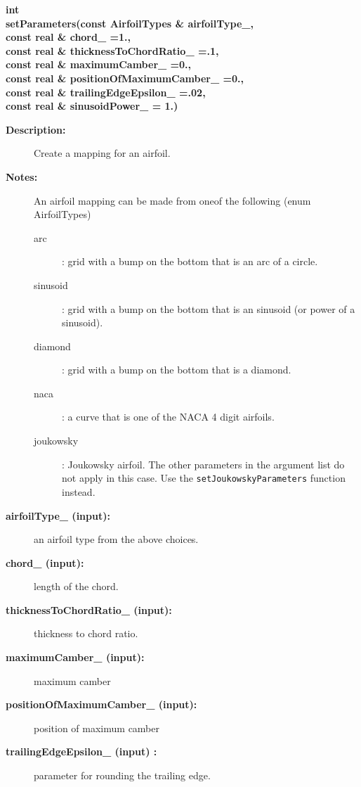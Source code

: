 \begin{flushleft} \textbf{%
int   \\ 
\settowidth{\AirfoilMappingIncludeArgIndent}{setParameters(}%
setParameters(const AirfoilTypes \& airfoilType\_,\\ 
\hspace{\AirfoilMappingIncludeArgIndent}const real \& chord\_  =1., \\ 
\hspace{\AirfoilMappingIncludeArgIndent}const real \& thicknessToChordRatio\_  =.1,\\ 
\hspace{\AirfoilMappingIncludeArgIndent}const real \& maximumCamber\_  =0.,\\ 
\hspace{\AirfoilMappingIncludeArgIndent}const real \& positionOfMaximumCamber\_  =0.,\\ 
\hspace{\AirfoilMappingIncludeArgIndent}const real \& trailingEdgeEpsilon\_   =.02,\\ 
\hspace{\AirfoilMappingIncludeArgIndent}const real \& sinusoidPower\_  = 1.)
}\end{flushleft}
\begin{description}
\item[{\bf Description:}] 
    Create a mapping for an airfoil.
\item[{\bf Notes:}]  An airfoil mapping can be made from oneof the following (enum AirfoilTypes)
  \begin{description}
   \item[arc] : grid with a bump on the bottom that is an arc of a circle.
   \item[sinusoid] : grid with a bump on the bottom that is an sinusoid (or power of a sinusoid).
   \item[diamond] : grid with a bump on the bottom that is a diamond.
   \item[naca] : a curve that is one of the NACA 4 digit airfoils.
   \item[joukowsky] : Joukowsky airfoil. The other parameters in the argument list
      do not apply in this case. Use the {\tt setJoukowskyParameters} function instead.
  \end{description}
\item[{\bf airfoilType\_ (input):}]  an airfoil type from the above choices.
\item[{\bf chord\_ (input):}]  length of the chord.
\item[{\bf thicknessToChordRatio\_ (input):}]  thickness to chord ratio.
\item[{\bf maximumCamber\_ (input):}]  maximum camber
\item[{\bf positionOfMaximumCamber\_ (input):}]  position of maximum camber
\item[{\bf trailingEdgeEpsilon\_ (input) :}]  parameter for rounding the trailing edge.
\end{description}
